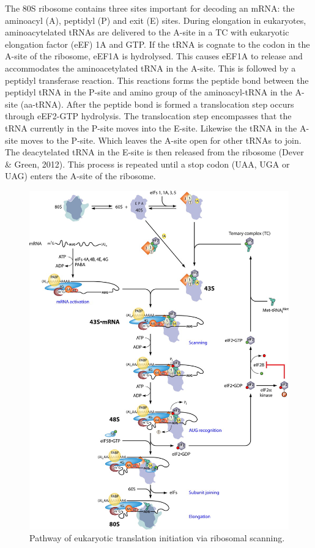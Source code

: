\documentclass[12pt,openany]{book}
\begin{document}
The 80S ribosome contains three sites important for decoding an mRNA:
the aminoacyl (A), peptidyl (P) and exit (E) sites. During elongation in
eukaryotes, aminoacytelated tRNAs are delivered to the A-site in a TC
with eukaryotic elongation factor (eEF) 1A and GTP. If the tRNA is
cognate to the codon in the A-site of the ribosome, eEF1A is hydrolysed.
This causes eEF1A to release and accommodates the aminoacetylated tRNA
in the A-site. This is followed by a peptidyl transferase reaction. This
reactions forms the peptide bond between the peptidyl tRNA in the P-site
and amino group of the aminoacyl-tRNA in the A-site (aa-tRNA). After the
peptide bond is formed a translocation step occurs through eEF2-GTP
hydrolysis. The translocation step encompasses that the tRNA currently
in the P-site moves into the E-site. Likewise the tRNA in the A-site
moves to the P-site. Which leaves the A-site open for other tRNAs to
join. The deacytelated tRNA in the E-site is then released from the
ribosome (Dever \& Green, 2012). This process is repeated until a stop
codon (UAA, UGA or UAG) enters the A-site of the ribosome.

\begin{figure}[ht]
\centering
\includegraphics[width=1.0\linewidth,height=0.7\textheight]{./figures/initiation.jpg} 
  \caption{Pathway of eukaryotic translation initiation via ribosomal scanning.
  \label{fig:initiation}}
\end{figure}
\end{document}
